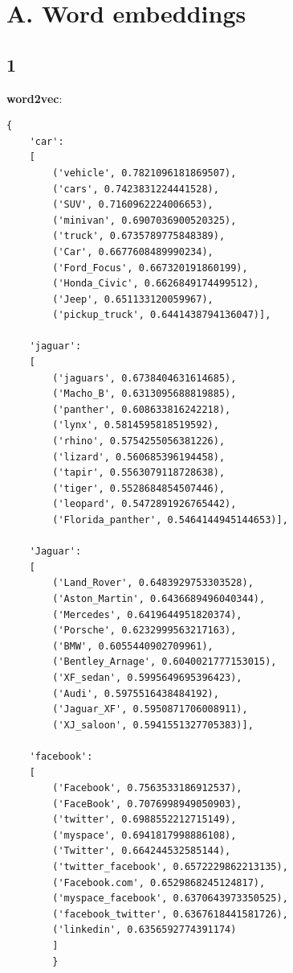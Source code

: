 \documentclass[8pt,a4paper]{report}%
\newcommand\blankpage{%
    \null
    \thispagestyle{empty}%
    \addtocounter{page}{-1}%
    \newpage}
\begin{document}

\section*{Α. Word embeddings}

\subsection*{1}

\textbf{word2vec}:

\begin{lstlisting}
{
    'car':
    [
        ('vehicle', 0.7821096181869507),
        ('cars', 0.7423831224441528),
        ('SUV', 0.7160962224006653),
        ('minivan', 0.6907036900520325),
        ('truck', 0.6735789775848389),
        ('Car', 0.6677608489990234),
        ('Ford_Focus', 0.667320191860199),
        ('Honda_Civic', 0.6626849174499512),
        ('Jeep', 0.651133120059967),
        ('pickup_truck', 0.6441438794136047)],

    'jaguar':
    [
        ('jaguars', 0.6738404631614685),
        ('Macho_B', 0.6313095688819885),
        ('panther', 0.608633816242218),
        ('lynx', 0.5814595818519592),
        ('rhino', 0.5754255056381226),
        ('lizard', 0.560685396194458),
        ('tapir', 0.5563079118728638),
        ('tiger', 0.5528684854507446),
        ('leopard', 0.5472891926765442),
        ('Florida_panther', 0.5464144945144653)],

    'Jaguar':
    [
        ('Land_Rover', 0.6483929753303528),
        ('Aston_Martin', 0.6436689496040344),
        ('Mercedes', 0.6419644951820374),
        ('Porsche', 0.6232999563217163),
        ('BMW', 0.6055440902709961),
        ('Bentley_Arnage', 0.6040021777153015),
        ('XF_sedan', 0.5995649695396423),
        ('Audi', 0.5975516438484192),
        ('Jaguar_XF', 0.5950871706008911),
        ('XJ_saloon', 0.5941551327705383)],

    'facebook':
    [
        ('Facebook', 0.7563533186912537),
        ('FaceBook', 0.7076998949050903),
        ('twitter', 0.6988552212715149),
        ('myspace', 0.6941817998886108),
        ('Twitter', 0.664244532585144),
        ('twitter_facebook', 0.6572229862213135),
        ('Facebook.com', 0.6529868245124817),
        ('myspace_facebook', 0.6370643973350525),
        ('facebook_twitter', 0.6367618441581726),
        ('linkedin', 0.6356592774391174)
        ]
        }
\end{lstlisting}
\end{document}
